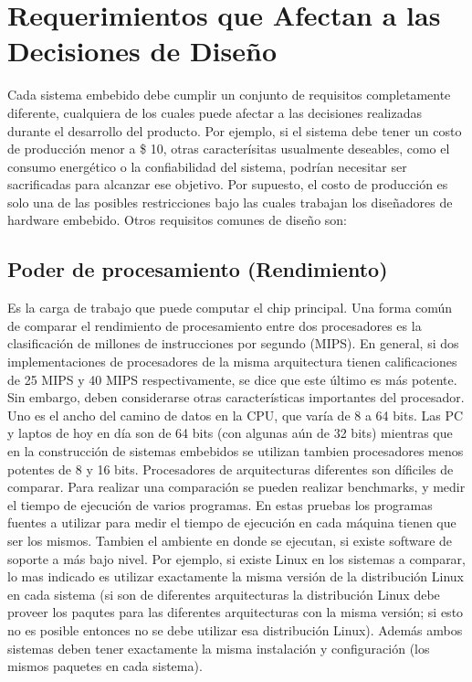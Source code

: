 \documentclass[output=paper, 
colorlinks,
citecolor=brown,
newtxmath
]{langscibook}
\begin{document}
\section {Requerimientos que Afectan a las Decisiones de Diseño}



Cada sistema embebido debe cumplir un conjunto de requisitos completamente 
diferente, cualquiera de los cuales puede afectar a las decisiones realizadas durante el 
desarrollo del producto. Por ejemplo, si el sistema debe tener un costo de producción menor a 
\$ 10, otras caracterísitas usualmente deseables, como el consumo energético o
la confiabilidad del sistema, podrían necesitar ser sacrificadas para alcanzar ese objetivo.
Por supuesto, el costo de producción es solo una de las posibles restricciones 
bajo las cuales trabajan los diseñadores de hardware embebido. Otros requisitos comunes 
de diseño son:



\subsection {Poder de procesamiento (Rendimiento)}



Es la carga de trabajo que puede computar el chip principal. 
Una forma común de comparar el rendimiento de procesamiento entre dos procesadores 
es la clasificación de millones de instrucciones por segundo (MIPS). En general,
si dos implementaciones de procesadores de la misma arquitectura tienen calificaciones 
de 25 MIPS y 40 MIPS respectivamente, se dice que este último es más potente. 
Sin embargo, deben considerarse otras características importantes del procesador. 
Uno es el ancho del camino de datos en la CPU, que varía de 8 a 64 bits. 
Las PC y laptos de hoy en día son de 64 bits (con algunas aún de 32 bits) 
mientras que en la construcción de sistemas embebidos
se utilizan tambien procesadores menos potentes de 8 y 16 bits.
Procesadores de arquitecturas diferentes son díficiles de comparar. Para
realizar una comparación se pueden realizar benchmarks, y medir el tiempo
de ejecución de varios programas. En estas pruebas los programas
fuentes a utilizar para medir el tiempo de ejecución en cada máquina
tienen que ser los mismos. Tambien el ambiente en donde se ejecutan,
si existe software de soporte a más bajo nivel. Por ejemplo, si existe
Linux en los sistemas a comparar, lo mas indicado es utilizar
exactamente la misma versión de la distribución Linux en cada
sistema (si son de diferentes arquitecturas la distribución Linux
debe proveer los paqutes para las diferentes arquitecturas con la misma versión;
si esto no es posible entonces no se debe utilizar esa distribución Linux).
Además ambos sistemas deben tener exactamente la misma instalación y 
configuración (los mismos paquetes en cada sistema).
\end{document}
